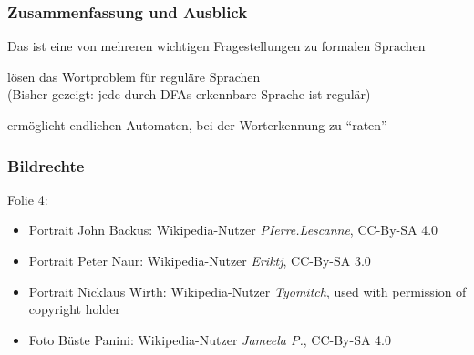 \documentclass[aspectratio=1610,onlymath]{beamer}
\begin{document}
\begin{frame}\frametitle{Zusammenfassung und Ausblick}

Das  ist eine von mehreren wichtigen Fragestellungen zu formalen Sprachen
\bigskip

 lösen das Wortproblem für reguläre Sprachen\\
\textcolor{devilscss}{(Bisher gezeigt: jede durch DFAs erkennbare Sprache ist regulär)}
\bigskip

 ermöglicht endlichen Automaten, bei der Worterkennung zu "`raten"'
\bigskip


\end{frame}



\begin{frame}\frametitle{Bildrechte}

Folie 4:\\
\begin{itemize}
\item Portrait John Backus: Wikipedia-Nutzer \emph{PIerre.Lescanne}, CC-By-SA 4.0
\item Portrait Peter Naur: Wikipedia-Nutzer \emph{Eriktj}, CC-By-SA 3.0
\item Portrait Nicklaus Wirth: Wikipedia-Nutzer  \emph{Tyomitch}, used with permission of copyright holder
\item Foto Büste Panini: Wikipedia-Nutzer \emph{Jameela P.}, CC-By-SA 4.0
\end{itemize}

\end{frame}%
\end{document}
